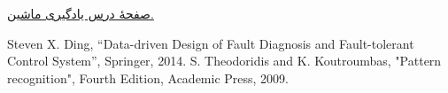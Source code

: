 \documentclass{article}
\begin{document}
\renewcommand{\section}[2]{}%
\begin{thebibliography}{99} %
 \href{https://github.com/MJAHMADEE/MachineLearning2023}{صفحۀ درس یادگیری ماشین.}
\begin{LTRitems}
\resetlatinfont
{} Steven X. Ding, “Data-driven Design of Fault Diagnosis and Fault-tolerant Control System”, Springer, 2014.
 S. Theodoridis and K. Koutroumbas, "Pattern recognition", Fourth Edition, Academic Press, 2009.
\end{LTRitems}

\end{thebibliography}
\end{document}

